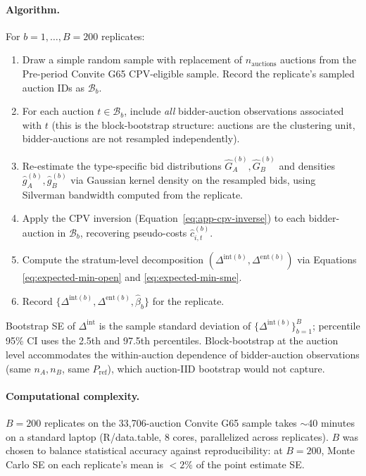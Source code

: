 \documentclass[12pt]{article}
\begin{document}
\paragraph{Algorithm.}
For $b = 1, \ldots, B = 200$ replicates:
\begin{enumerate}
\item[1.] Draw a simple random sample with replacement of
$n_{\text{auctions}}$ auctions from the Pre-period Convite G65
CPV-eligible sample. Record the replicate's sampled auction IDs
as $\mathcal{B}_b$.
\item[2.] For each auction $t \in \mathcal{B}_b$, include \emph{all}
bidder-auction observations associated with $t$ (this is the
block-bootstrap structure: auctions are the clustering unit,
bidder-auctions are not resampled independently).
\item[3.] Re-estimate the type-specific bid distributions
$\hat G_A^{(b)}, \hat G_B^{(b)}$ and densities $\hat g_A^{(b)},
\hat g_B^{(b)}$ via Gaussian kernel density on the resampled
bids, using Silverman bandwidth computed from the replicate.
\item[4.] Apply the CPV inversion
(Equation~\ref{eq:app-cpv-inverse}) to each bidder-auction in
$\mathcal{B}_b$, recovering pseudo-costs $\hat c_{i,t}^{(b)}$.
\item[5.] Compute the stratum-level decomposition $(\Delta^{\text{int}(b)},
\Delta^{\text{ent}(b)})$ via Equations \eqref{eq:expected-min-open}
and \eqref{eq:expected-min-sme}.
\item[6.] Record $\{\Delta^{\text{int}(b)}, \Delta^{\text{ent}(b)},
\hat\beta_b\}$ for the replicate.
\end{enumerate}

Bootstrap SE of $\Delta^{\text{int}}$ is the sample standard
deviation of $\{\Delta^{\text{int}(b)}\}_{b=1}^{B}$; percentile
95\% CI uses the 2.5th and 97.5th percentiles. Block-bootstrap
at the auction level accommodates the within-auction dependence
of bidder-auction observations (same $n_A, n_B$, same
$P_{\text{ref}}$), which auction-IID bootstrap would not
capture.

\paragraph{Computational complexity.}
$B = 200$ replicates on the 33{,}706-auction Convite G65 sample
takes $\sim$40 minutes on a standard laptop (R/data.table, 8
cores, parallelized across replicates). $B$ was chosen to
balance statistical accuracy against reproducibility: at
$B = 200$, Monte Carlo SE on each replicate's mean is
$< 2\%$ of the point estimate SE.
\end{document}
